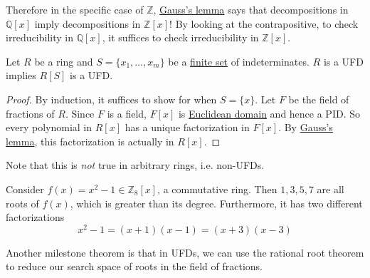   Therefore in the specific case of $\mathbb{Z}$, \hyperref[thm:gausss-lemma]{Gauss's lemma} says that decompositions in $\mathbb{Q}[x]$ imply decompositions in $\mathbb{Z}[x]$! By looking at the contrapositive, to check irreducibility in $\mathbb{Q}[x]$, it suffices to check irreducibility in $\mathbb{Z}[x]$. 

  \begin{theorem}
    \label{thm:conditions-for-rlbrackxrbrack-to-be-a-ufd}
    Let $R$ be a ring and $S = \{x_1, \ldots, x_m\}$ be a \hyperref[st-def:finite-set]{finite set} of indeterminates. $R$ is a UFD implies $R[S]$ is a UFD. 
  \end{theorem}
  \begin{proof}
    By induction, it suffices to show for when $S = \{x\}$. Let $F$ be the field of fractions of $R$. Since $F$ is a field, $F[x]$ is \hyperref[def:euclidean-domain]{Euclidean domain} and hence a PID. So every polynomial in $R[x]$ has a unique factorization in $F[x]$. By \hyperref[thm:gausss-lemma]{Gauss's lemma}, this factorization is actually in $R[x]$. 
  \end{proof}

  Note that this is \textit{not} true in arbitrary rings, i.e. non-UFDs. 

  \begin{example}
    \label{ex:linear-polynomial-with-3-roots}
    Consider $f(x) = x^2 - 1 \in \mathbb{Z}_8 [x]$, a commutative ring. Then $1, 3, 5, 7$ are all roots of $f(x)$, which is greater than its degree. Furthermore, it has two different factorizations 
    \begin{equation}
      x^2 - 1 = (x + 1)(x - 1) = (x + 3)(x - 3)
    \end{equation}
  \end{example} 

  Another milestone theorem is that in UFDs, we can use the rational root theorem to reduce our search space of roots in the field of fractions.  


